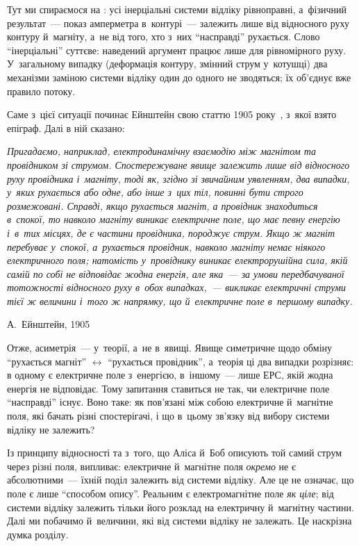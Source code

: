 Тут ми спираємося на : усі інерціальні системи відліку
рівноправні, а~фізичний результат~--- показ амперметра в~контурі~--- залежить лише від
відносного руху контуру й~магніту, а~не від того, хто з~них \enquote{насправді} рухається. Слово
\enquote{інерціальні} суттєве: наведений аргумент працює лише для рівномірного руху. У~загальному випадку
(деформація контуру, змінний струм у~котушці) два механізми заміною системи відліку один до
одного не зводяться; їх об'єднує вже правило потоку.

Саме з~цієї ситуації починає Ейнштейн свою статтю 1905 року~\cite{Einstein1905}, з~якої взято епіграф. Далі в
ній сказано:
\begin{tornpage}\small\itshape
	Пригадаємо, наприклад, електродинамічну взаємодію між магнітом та провідником зі
	струмом. Спостережуване явище залежить лише від відносного руху провідника і~магніту,
	тоді як, згідно зі звичайним уявленням, два випадки, у~яких рухається або одне, або
	інше з~цих тіл, повинні бути строго розмежовані. Справді, якщо рухається магніт, а
	провідник знаходиться в~спокої, то навколо магніту виникає електричне поле, що має
	певну енергію і~в~тих місцях, де є частини провідника, породжує
	струм. Якщо ж магніт перебуває у~спокої, а~рухається провідник, навколо магніту немає
	ніякого електричного поля; натомість у~провіднику виникає електрорушійна сила, якій
	самій по собі не відповідає жодна енергія, але яка~--- за умови передбачуваної
	тотожності відносного руху в~обох випадках,~--- викликає електричні струми тієї ж
	величини і~того ж напрямку, що й~електричне поле в~першому випадку.

	\hfill А.~Ейнштейн, 1905
\end{tornpage}

Отже, асиметрія~--- у~теорії, а~не в~явищі. Явище симетричне щодо обміну \enquote{рухається
магніт} $\leftrightarrow$ \enquote{рухається провідник}, а~теорія ці два випадки розрізняє: в
одному є електричне поле з~енергією, в~іншому~--- лише ЕРС, якій жодна енергія не
відповідає. Тому запитання ставиться не так, чи електричне поле \enquote{насправді} існує. Воно
таке: як пов'язані між собою електричне й~магнітне поля, які бачать різні спостерігачі, і
що в~цьому зв'язку від вибору системи відліку не залежить?

\begin{Attention}
	Із принципу відносності та з~того, що Аліса й~Боб описують той самий струм через різні
	поля, випливає: електричне й~магнітне поля \emph{окремо} не є абсолютними~--- їхній
	поділ залежить від системи відліку. Але це не означає, що поле є лише \enquote{способом
	опису}. Реальним є електромагнітне поле \emph{як ціле}; від системи відліку залежить
	тільки його розклад на електричну й~магнітну частини. Далі ми побачимо й~величини, які
	від системи відліку не залежать. Це наскрізна думка розділу.
\end{Attention}

